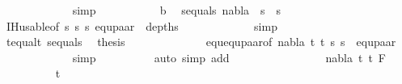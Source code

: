 \begin{isabellebody}
\ \ \ \ \ \ \ \ \ \ \ \isamarkupfalse%
\ simp\isanewline
\ \ \ \ \ \ \ \ \ \isamarkupfalse%
\ b\ \isamarkupfalse%
\ s{}{\isacharunderscore}{\kern0pt}equal{\isacharunderscore}{\kern0pt}s{}{\isacharcolon}{\kern0pt}\ {\isachardoublequoteopen}nabla\ {\isasymturnstile}\ s{}{\isacharprime}{\kern0pt}\ {\isasymapprox}\ s{}{\isacharprime}{\kern0pt}{\isachardoublequoteclose}\ \isanewline
\ \ \ \ \ \ \ \ \ \ \ \isamarkupfalse%
\ IH{\isacharunderscore}{\kern0pt}usable{\isacharbrackleft}{\kern0pt}of\ s{}{\isacharprime}{\kern0pt}\ s{}{\isacharprime}{\kern0pt}\ s{}{\isacharprime}{\kern0pt}{\isacharbrackright}{\kern0pt}\ equ{\isacharunderscore}{\kern0pt}paar{\isacharparenleft}{\kern0pt}{}{\isacharparenright}{\kern0pt}\ {}{\isacharparenleft}{\kern0pt}{}{\isacharparenright}{\kern0pt}\ depths{}\isanewline
\ \ \ \ \ \ \ \ \ \ \ \isamarkupfalse%
\ simp\isanewline
\ \ \ \ \ \ \ \ \ \isamarkupfalse%
\ t{}{\isacharunderscore}{\kern0pt}equal{\isacharunderscore}{\kern0pt}t{}\ s{}{\isacharunderscore}{\kern0pt}equal{\isacharunderscore}{\kern0pt}s{}\ \isamarkupfalse%
\ {\isacharquery}{\kern0pt}thesis\ \isanewline
\ \ \ \ \ \ \ \ \ \ \ \isamarkupfalse%
\ equ{\isachardot}{\kern0pt}equ{\isacharunderscore}{\kern0pt}paar{\isacharbrackleft}{\kern0pt}of\ nabla\ t{}{\isacharprime}{\kern0pt}\ t{}{\isacharprime}{\kern0pt}\ s{}{\isacharprime}{\kern0pt}\ s{}{\isacharprime}{\kern0pt}{\isacharbrackright}{\kern0pt}\ {}{\isacharparenleft}{\kern0pt}{}{\isacharcomma}{\kern0pt}{}{\isacharparenright}{\kern0pt}\ equ{\isacharunderscore}{\kern0pt}paar{\isacharparenleft}{\kern0pt}{}{\isacharparenright}{\kern0pt}\isanewline
\ \ \ \ \ \ \ \ \ \ \ \isamarkupfalse%
\ simp\isanewline
\ \ \ \ \ \ \ \ \isamarkupfalse%
\ {\isacharparenleft}{\kern0pt}auto\ simp\ add{\isacharcolon}{\kern0pt}\ {}{\isacharparenright}{\kern0pt}\isanewline
\ \ \ \ \ \isamarkupfalse%
\isanewline
\ \ \ \ \ \ \ \isamarkupfalse%
\ {\isacharparenleft}{\kern0pt}{}\ nabla\ t{}\ t{}\ F{\isacharparenright}{\kern0pt}\isanewline
\ \ \ \ \ \ \ \ \isamarkupfalse%
\ t{}{}\ \isamarkupfalse%

\end{isabellebody}
